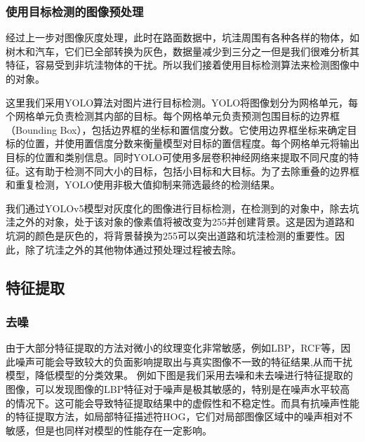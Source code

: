 \documentclass[a4paper, 10pt]{article}
\begin{document}
	\subsubsection{使用目标检测的图像预处理}
	
	经过上一步对图像灰度处理，此时在路面数据中，坑洼周围有各种各样的物体，如树木和汽车，它们已全部转换为灰色，数据量减少到三分之一但是我们很难分析其特征，容易受到非坑洼物体的干扰。所以我们接着使用目标检测算法来检测图像中的对象。
	
	这里我们采用YOLO算法对图片进行目标检测。YOLO将图像划分为网格单元，每个网格单元负责检测其内部的目标。每个网格单元负责预测包围目标的边界框（Bounding Box），包括边界框的坐标和置信度分数。它使用边界框坐标来确定目标的位置，并使用置信度分数来衡量模型对目标的置信程度。每个网格单元将输出目标的位置和类别信息。同时YOLO可使用多层卷积神经网络来提取不同尺度的特征。这有助于检测不同大小的目标，包括小目标和大目标。为了去除重叠的边界框和重复检测，YOLO使用非极大值抑制来筛选最终的检测结果。
	
	我们通过YOLOv5模型对灰度化的图像进行目标检测，在检测到的对象中，除去坑洼之外的对象，处于该对象的像素值将被改变为255并创建背景。这是因为道路和坑洞的颜色是灰色的，将背景替换为255可以突出道路和坑洼检测的重要性。因此，除了坑洼之外的其他物体通过预处理过程被去除。
	
	
	\subsection{特征提取}
	
	\subsubsection{去噪}
	
	由于大部分特征提取的方法对微小的纹理变化非常敏感，例如LBP，RCF等，因此噪声可能会导致较大的负面影响提取出与真实图像不一致的特征结果,从而干扰模型，降低模型的分类效果。
	例如下图是我们采用去噪和未去噪进行特征提取的图像，可以发现图像的LBP特征对于噪声是极其敏感的，特别是在噪声水平较高的情况下。这可能会导致特征提取结果中的虚假性和不稳定性。而具有抗噪声性能的特征提取方法，如局部特征描述符HOG，它们对局部图像区域中的噪声相对不敏感，但是也同样对模型的性能存在一定影响。
	
\end{document}
